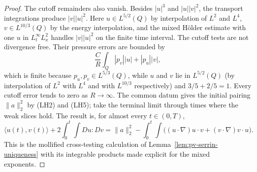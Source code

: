 \documentclass[11pt,letterpaper]{article}
\numberwithin{equation}{section}
\theoremstyle{plain}
\theoremstyle{definition}
\theoremstyle{remark}
\begin{document}
\begin{proof}
The cutoff remainders also vanish. Besides $|u|^3$ and
$|u||v|^2$, the transport integrations produce $|v||u|^2$.
Here $u\in L^{5/2}(Q)$ by interpolation of $L^2$ and $L^4$,
$v\in L^{10/3}(Q)$ by the energy interpolation, and the mixed
H\"older estimate with one $u$ in $L^\infty_tL^2_x$ handles
$|v||u|^2$ on the finite time interval. The cutoff tests are not
divergence free. Their pressure errors are bounded by
\[
\frac C R\int_Q |p_v||u|+|p_u||v|,
\]
which is finite because $p_u,p_v\in L^{5/3}(Q)$, while $u$ and $v$ lie in
$L^{5/2}(Q)$ (by interpolation of $L^2$ with $L^4$ and with $L^{10/3}$
respectively) and $3/5+2/5=1$.
Every cutoff error tends to zero as $R\to\infty$.
The common datum gives the initial pairing $\|a\|_2^2$ by (LH2) and (LH5);
take the terminal limit through times where the weak slices hold. The result
is, for almost every $t\in(0,T)$,
\begin{equation*}
\langle u(t),v(t)\rangle+2\int_{0}^t\!\int Du:Dv
=\|a\|_2^2
-\int_{0}^t\!\int
  \bigl((u\cdot\nabla)u\cdot v+(v\cdot\nabla)v\cdot u\bigr).
\end{equation*}
This is the mollified cross-testing calculation of
Lemma~\ref{lem:pv-serrin-uniqueness} with its integrable products
made explicit for the mixed exponents.


\end{proof}
\end{document}
